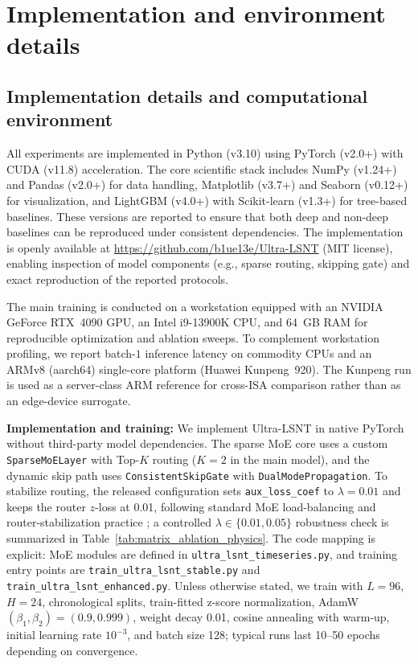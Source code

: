 \documentclass[review,1p,times]{elsarticle}
\begin{document}
\section{Implementation and environment details}\label{app:impl_details}

\subsection{Implementation details and computational environment}
\label{app:impl_details_sub}

All experiments are implemented in Python (v3.10) using PyTorch (v2.0+) with CUDA (v11.8) acceleration. The core scientific stack includes NumPy (v1.24+) and Pandas (v2.0+) for data handling, Matplotlib (v3.7+) and Seaborn (v0.12+) for visualization, and LightGBM (v4.0+) with Scikit-learn (v1.3+) for tree-based baselines. These versions are reported to ensure that both deep and non-deep baselines can be reproduced under consistent dependencies. The implementation is openly available at \url{https://github.com/b1ue13e/Ultra-LSNT} (MIT license), enabling inspection of model components (e.g., sparse routing, skipping gate) and exact reproduction of the reported protocols.

The main training is conducted on a workstation equipped with an NVIDIA GeForce RTX~4090 GPU, an Intel i9-13900K CPU, and 64~GB RAM for reproducible optimization and ablation sweeps. To complement workstation profiling, we report batch-$1$ inference latency on commodity CPUs and an ARMv8 (aarch64) single-core platform (Huawei Kunpeng~920). The Kunpeng run is used as a server-class ARM reference for cross-ISA comparison rather than as an edge-device surrogate.



\noindent\textbf{Implementation and training:} We implement Ultra-LSNT in native PyTorch without third-party model dependencies. The sparse MoE core uses a custom \texttt{SparseMoELayer} with Top-$K$ routing ($K=2$ in the main model), and the dynamic skip path uses \texttt{ConsistentSkipGate} with \texttt{DualModePropagation}. To stabilize routing, the released configuration sets \texttt{aux\_loss\_coef} to $\lambda=0.01$ and keeps the router $z$-loss at 0.01, following standard MoE load-balancing and router-stabilization practice \citep{shazeer2017moe,fedus2022switch}; a controlled $\lambda\in\{0.01,0.05\}$ robustness check is summarized in Table~\ref{tab:matrix_ablation_physics}. The code mapping is explicit: MoE modules are defined in \texttt{ultra\_lsnt\_timeseries.py}, and training entry points are \texttt{train\_ultra\_lsnt\_stable.py} and \texttt{train\_ultra\_lsnt\_enhanced.py}. Unless otherwise stated, we train with $L=96$, $H=24$, chronological splits, train-fitted z-score normalization, AdamW $(\beta_1,\beta_2)=(0.9,0.999)$, weight decay 0.01, cosine annealing with warm-up, initial learning rate $10^{-3}$, and batch size 128; typical runs last 10--50 epochs depending on convergence.
\end{document}
